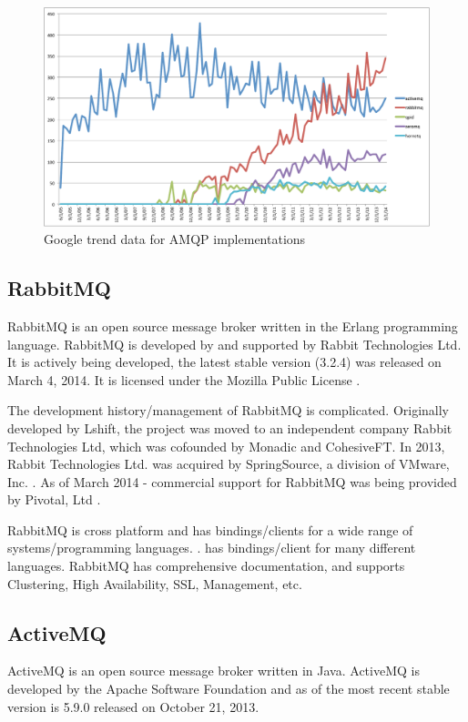\documentclass{thesis}
\begin{document}
\begin{figure}
\centering
\vspace{2.0in} 
\includegraphics[scale=.5]{broker_popularity}  
\caption{Google trend data for AMQP implementations}
\label{Figure 1}  
\end{figure}


\subsection{RabbitMQ}
RabbitMQ is an open source message broker written in the Erlang programming language.   RabbitMQ is developed by and supported by Rabbit Technologies Ltd.  It is actively being developed, the latest stable version (3.2.4) was released on March 4, 2014.  It is licensed under the Mozilla Public License \cite{rabbitmq-wikipedia}.

The development history/management of RabbitMQ is complicated.  Originally developed by Lshift, the project was moved to an independent company Rabbit Technologies Ltd, which was cofounded by Monadic and CohesiveFT.  In 2013, Rabbit Technologies Ltd. was acquired by SpringSource, a division of VMware, Inc. .  As of March 2014 - commercial support for RabbitMQ was being provided by Pivotal, Ltd  .

RabbitMQ is cross platform and has bindings/clients for a wide range of systems/programming languages.  .  has bindings/client for many different languages.  RabbitMQ has comprehensive documentation, and supports Clustering, High Availability, SSL, Management, etc. 

\subsection{ActiveMQ}
ActiveMQ is an open source message broker written in Java.  ActiveMQ is developed by the Apache Software Foundation and as of  the most recent stable version is 5.9.0 released on October 21, 2013.
\end{document}
